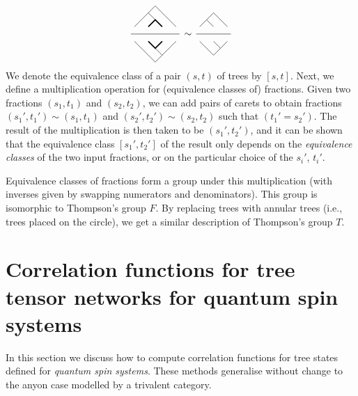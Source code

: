 \documentclass[11pt,oneside]{amsart}
\theoremstyle{plain}%
\theoremstyle{definition}
\theoremstyle{remark}
\begin{document}
\begin{equation}
	\begin{tikzpicture}[scale=0.25,baseline=-3.5mm]
		\draw[very thick] (2.0, 0.0) -- (3.0, 1.0) -- (4.0, 0.0);
		\draw (0.0, 0.0) -- (2.0, 2.0) -- (3.0, 1.0);
		\draw (2.0, 2.0) -- (3.0, 3.0) -- (6.0, 0.0);

		\draw[yshift=-30pt] (-0.5, 0) -- (6.5, 0);

		\begin{scope}[yscale=-1, yshift=60pt]
			\draw[very thick] (2.0, 0.0) -- (3.0, 1.0) -- (4.0, 0.0);
			\draw (3.0, 1.0) -- (4.0, 2.0) -- (6.0, 0.0);
			\draw (0.0, 0.0) -- (3.0, 3.0) -- (4.0, 2.0);
		\end{scope}
	\end{tikzpicture}\,\sim\,
	\begin{tikzpicture}[scale=0.25,baseline=-3.5mm]
		\draw (0.0, 0.0) -- (1.0, 1.0) -- (2.0, 0.0);
		\draw (1.0, 1.0) -- (2.0, 2.0) -- (4.0, 0.0);

		\draw[yshift=-30pt] (-0.5, 0) -- (4.5, 0);

		\begin{scope}[yscale=-1, yshift=60pt]
			\draw (2.0, 0.0) -- (3.0, 1.0) -- (4.0, 0.0);
			\draw (0.0, 0.0) -- (2.0, 2.0) -- (3.0, 1.0);
		\end{scope}
	\end{tikzpicture}
\end{equation}
We denote the equivalence class of a pair $(s, t)$ of trees by $[s, t]$. Next, we define a multiplication operation for (equivalence classes of) fractions. Given two fractions $(s_1, t_1)$ and $(s_2, t_2)$, we can add pairs of carets to obtain fractions $(s_1', t_1')\sim (s_1, t_1)$ and $(s_2', t_2')\sim (s_2, t_2)$ such that $(t_1'=s_2')$. The result of the multiplication is then taken to be $(s_1', t_2')$, and it can be shown that the equivalence class $[s_1', t_2']$ of the result only depends on the \emph{equivalence classes} of the two input fractions, or on the particular choice of the $s_i'$, $t_i'$.

Equivalence classes of fractions form a group under this multiplication (with inverses given by swapping numerators and denominators). This group is isomorphic to Thompson's group $F$. By replacing trees with annular trees (i.e., trees placed on the circle), we get a similar description of Thompson's group $T$.


\section{Correlation functions for tree tensor networks for quantum spin systems}\label{sec:corrfunstrees}
In this section we discuss how to compute correlation functions for tree states defined for \emph{quantum spin systems}. These methods generalise without change to the anyon case modelled by a trivalent category.
\end{document}
